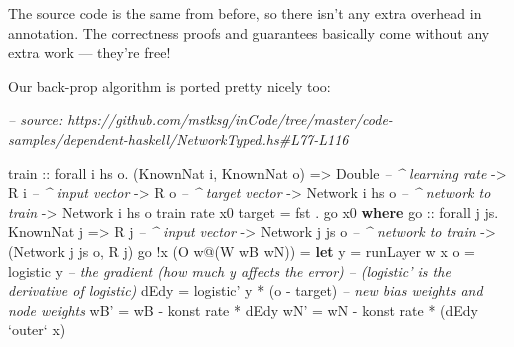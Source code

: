 \documentclass[]{article}
\newenvironment{Shaded}{}{}
\newcommand{\CommentTok}[1]{\textcolor[rgb]{0.38,0.63,0.69}{\textit{#1}}}
\newcommand{\DataTypeTok}[1]{\textcolor[rgb]{0.56,0.13,0.00}{#1}}
\newcommand{\FunctionTok}[1]{\textcolor[rgb]{0.02,0.16,0.49}{#1}}
\newcommand{\KeywordTok}[1]{\textcolor[rgb]{0.00,0.44,0.13}{\textbf{#1}}}
\newcommand{\NormalTok}[1]{#1}
\newcommand{\OtherTok}[1]{\textcolor[rgb]{0.00,0.44,0.13}{#1}}
\begin{document}
The source code is the same from before, so there isn't any extra overhead in
annotation. The correctness proofs and guarantees basically come without any
extra work --- they're free!

Our back-prop algorithm is ported pretty nicely too:

\begin{Shaded}
\begin{Highlighting}[]
\CommentTok{-- source: https://github.com/mstksg/inCode/tree/master/code-samples/dependent-haskell/NetworkTyped.hs#L77-L116}

\OtherTok{train ::}\NormalTok{ forall i hs o}\FunctionTok{.}\NormalTok{ (}\DataTypeTok{KnownNat}\NormalTok{ i, }\DataTypeTok{KnownNat}\NormalTok{ o)}
      \OtherTok{=>} \DataTypeTok{Double}           \CommentTok{-- ^ learning rate}
      \OtherTok{->} \DataTypeTok{R}\NormalTok{ i              }\CommentTok{-- ^ input vector}
      \OtherTok{->} \DataTypeTok{R}\NormalTok{ o              }\CommentTok{-- ^ target vector}
      \OtherTok{->} \DataTypeTok{Network}\NormalTok{ i hs o   }\CommentTok{-- ^ network to train}
      \OtherTok{->} \DataTypeTok{Network}\NormalTok{ i hs o}
\NormalTok{train rate x0 target }\FunctionTok{=}\NormalTok{ fst }\FunctionTok{.}\NormalTok{ go x0}
  \KeywordTok{where}
\OtherTok{    go  ::}\NormalTok{ forall j js}\FunctionTok{.} \DataTypeTok{KnownNat}\NormalTok{ j}
        \OtherTok{=>} \DataTypeTok{R}\NormalTok{ j              }\CommentTok{-- ^ input vector}
        \OtherTok{->} \DataTypeTok{Network}\NormalTok{ j js o   }\CommentTok{-- ^ network to train}
        \OtherTok{->}\NormalTok{ (}\DataTypeTok{Network}\NormalTok{ j js o, }\DataTypeTok{R}\NormalTok{ j)}
\NormalTok{    go }\FunctionTok{!}\NormalTok{x (}\DataTypeTok{O}\NormalTok{ w}\FunctionTok{@}\NormalTok{(}\DataTypeTok{W}\NormalTok{ wB wN))}
        \FunctionTok{=} \KeywordTok{let}\NormalTok{ y    }\FunctionTok{=}\NormalTok{ runLayer w x}
\NormalTok{              o    }\FunctionTok{=}\NormalTok{ logistic y}
              \CommentTok{-- the gradient (how much y affects the error)}
              \CommentTok{--   (logistic' is the derivative of logistic)}
\NormalTok{              dEdy }\FunctionTok{=}\NormalTok{ logistic' y }\FunctionTok{*}\NormalTok{ (o }\FunctionTok{-}\NormalTok{ target)}
              \CommentTok{-- new bias weights and node weights}
\NormalTok{              wB'  }\FunctionTok{=}\NormalTok{ wB }\FunctionTok{-}\NormalTok{ konst rate }\FunctionTok{*}\NormalTok{ dEdy}
\NormalTok{              wN'  }\FunctionTok{=}\NormalTok{ wN }\FunctionTok{-}\NormalTok{ konst rate }\FunctionTok{*}\NormalTok{ (dEdy }\OtherTok{`outer`}\NormalTok{ x)}

\end{Highlighting}
\end{Shaded}
\end{document}
